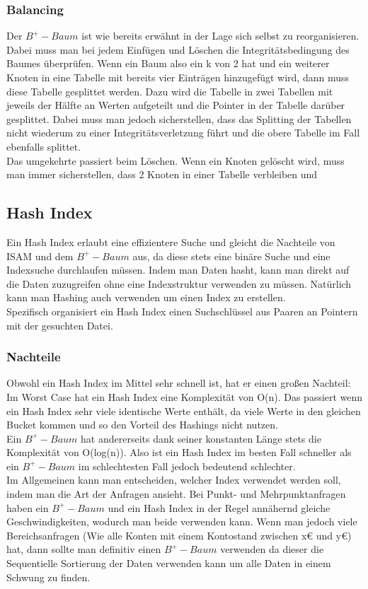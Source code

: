 \documentclass{article}
\begin{document}
	\subsubsection{Balancing}
	Der $B^+-Baum$ ist wie bereits erwähnt in der Lage sich selbst zu reorganisieren. Dabei muss man bei jedem Einfügen und Löschen die Integritätsbedingung des Baumes überprüfen. Wenn ein Baum also ein k von 2 hat und ein weiterer Knoten in eine Tabelle mit bereits vier Einträgen hinzugefügt wird, dann muss diese Tabelle gesplittet werden. Dazu wird die Tabelle in zwei Tabellen mit jeweils der Hälfte an Werten aufgeteilt und die Pointer in der Tabelle darüber gesplittet. Dabei muss man jedoch sicherstellen, dass das Splitting der Tabellen nicht wiederum zu einer Integritätsverletzung führt und die obere Tabelle im Fall ebenfalls splittet. \\
	Das umgekehrte passiert beim Löschen. Wenn ein Knoten gelöscht wird, muss man immer sicherstellen, dass 2 Knoten in einer Tabelle verbleiben und 
	\subsection{Hash Index}
	Ein Hash Index erlaubt eine effizientere Suche und gleicht die Nachteile von ISAM und dem $B^+-Baum$ aus, da diese stets eine binäre Suche und eine Indexsuche durchlaufen müssen. Indem man Daten hasht, kann man direkt auf die Daten zuzugreifen ohne eine Indexstruktur verwenden zu müssen. Natürlich kann man Hashing auch verwenden um einen Index zu erstellen. \\
	Spezifisch organisiert ein Hash Index einen Suchschlüssel aus Paaren an Pointern mit der gesuchten Datei.
	\subsubsection{Nachteile}
	Obwohl ein Hash Index im Mittel sehr schnell ist, hat er einen großen Nachteil: Im Worst Case hat ein Hash Index eine Komplexität von O(n). Das passiert wenn ein Hash Index sehr viele identische Werte enthält, da viele Werte in den gleichen Bucket kommen und so den Vorteil des Hashings nicht nutzen. \\
	Ein $B^+-Baum$ hat andererseits dank seiner konstanten Länge stets die Komplexität von O(log(n)). Also ist ein Hash Index im besten Fall schneller als ein $B^+-Baum$ im schlechtesten Fall jedoch bedeutend schlechter. \\
	Im Allgemeinen kann man entscheiden, welcher Index verwendet werden soll, indem man die Art der Anfragen ansieht. Bei Punkt- und Mehrpunktanfragen haben ein $B^+-Baum$ und ein Hash Index in der Regel annähernd gleiche Geschwindigkeiten, wodurch man beide verwenden kann. Wenn man jedoch viele Bereichsanfragen (Wie alle Konten mit einem Kontostand zwischen x€ und y€) hat, dann sollte man definitiv einen $B^+-Baum$ verwenden da dieser die Sequentielle Sortierung der Daten verwenden kann um alle Daten in einem Schwung zu finden.
\end{document}
